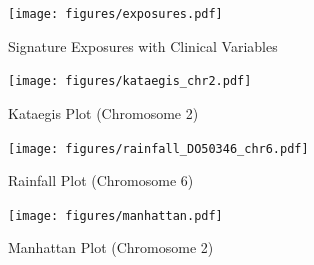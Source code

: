 \documentclass[12pt, letterpaper]{article}
\begin{document}
\begin{figure}[h!]
    \centering
    \texttt{[image: figures/exposures.pdf]}
    \caption{Signature Exposures with Clinical Variables}
\end{figure}
\begin{figure}[h!]
    \centering
    \texttt{[image: figures/kataegis\_chr2.pdf]}
    \caption{Kataegis Plot (Chromosome 2)}
\end{figure}
\begin{figure}[h!]
    \centering
    \texttt{[image: figures/rainfall\_DO50346\_chr6.pdf]}
    \caption{Rainfall Plot (Chromosome 6)}
\end{figure}
\begin{figure}[h!]
    \centering
    \texttt{[image: figures/manhattan.pdf]}
    \caption{Manhattan Plot (Chromosome 2)}
\end{figure}
\end{document}
